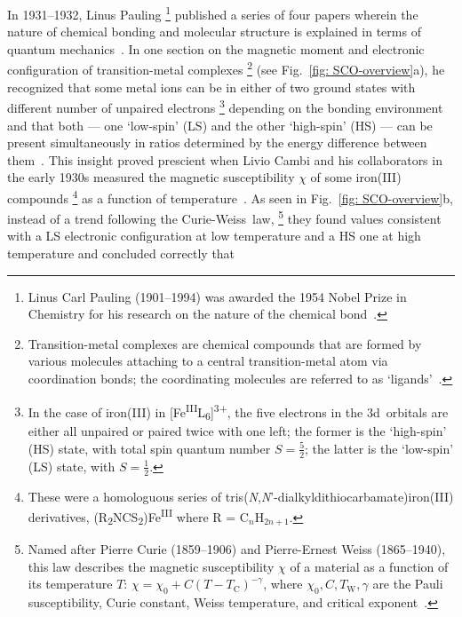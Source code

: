 In 1931--1932, Linus Pauling%
\footnote{Linus Carl Pauling (1901--1994) was awarded the 1954 Nobel Prize in Chemistry
for his research on the nature of the chemical bond~\cite{Nobel1942}.} published a series of four papers
wherein the nature of chemical bonding and molecular structure is explained
in terms of quantum mechanics~\cite{Pauling1931a, Pauling1931b, Pauling1932a, Pauling1932b}.
%
In one section on the magnetic moment and electronic configuration of transition-metal complexes%
\footnote{Transition-metal complexes are chemical compounds that are formed
by various molecules attaching to a central transition-metal atom via coordination bonds;
the coordinating molecules are referred to as `ligands'~\cite{Brock1983}.}
(see Fig.~\ref{fig: SCO-overview}a),
he recognized that some metal ions can be in either of two ground states
with different number of unpaired electrons%
\footnote{In the case of iron(III) in [Fe\textsuperscript{III}L\textsubscript{6}]\textsuperscript{3+},
the five electrons in the 3d~orbitals are either all unpaired or paired twice with one left;
the former is the `high-spin' (HS) state, with total spin quantum number $S = \frac{5}{2}$;
the latter is the `low-spin' (LS) state, with $S = \frac{1}{2}$.}
depending on the bonding environment and that both
--- one `low-spin' (LS) and the other `high-spin' (HS) ---
can be present simultaneously in ratios determined by
the energy difference between them~\cite{Pauling1932a, SCO-I}.
%
This insight proved prescient when Livio Cambi and his collaborators in the early 1930s
measured the magnetic susceptibility $\chi$ of some iron(III) compounds%
\footnote{These were a homologuous series
of tris(\textit{N},\textit{N}'-dialkyldithiocarbamate)iron(III) derivatives,
(R\textsubscript{2}NCS\textsubscript{2})Fe\textsuperscript{III} where R = C$_n$H$_{2 n + 1}$.}
as a function of temperature~\cite{Cambi1931, Cambi1933}.
As seen in Fig.~\ref{fig: SCO-overview}b,
instead of a trend following the Curie-Weiss~law,%
\footnote{Named after Pierre Curie (1859--1906) and Pierre-Ernest Weiss (1865--1940),
this law describes the magnetic susceptibility $\chi$ of a material as a function of
its temperature $T$: $\chi = \chi_0 + C (T - T_\text{C})^{-\gamma}$,
where $\chi_0, C, T_\text{W}, \gamma$ are the Pauli susceptibility, Curie constant,
Weiss temperature, and critical exponent~\cite{Nobel1901, AshcroftBook}.}
they found values consistent with a LS electronic configuration at low temperature
and a HS one at high temperature and concluded correctly that
